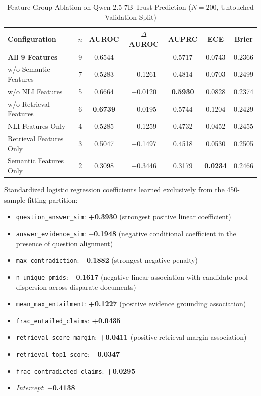 \documentclass[journal,10pt]{IEEEtran}
\begin{document}
\begin{table}[htbp]
\caption{Feature Group Ablation on Qwen 2.5 7B Trust Prediction ($N=200$, Untouched Validation Split)}
\label{tab:ablation}
\centering
\begin{tabular}{lcccccc}
\toprule
\textbf{Configuration} & \textbf{$n$} & \textbf{AUROC} & \textbf{$\Delta$ AUROC} & \textbf{AUPRC} & \textbf{ECE} & \textbf{Brier} \\
\midrule
\textbf{All 9 Features} & 9 & 0.6544 & --- & 0.5717 & 0.0743 & 0.2366 \\
w/o Semantic Features & 7 & 0.5283 & $-$0.1261 & 0.4814 & 0.0703 & 0.2499 \\
w/o NLI Features & 5 & 0.6664 & +0.0120 & \textbf{0.5930} & 0.0828 & 0.2374 \\
w/o Retrieval Features & 6 & \textbf{0.6739} & +0.0195 & 0.5744 & 0.1204 & 0.2429 \\
NLI Features Only & 4 & 0.5285 & $-$0.1259 & 0.4732 & 0.0452 & 0.2455 \\
Retrieval Features Only & 3 & 0.5047 & $-$0.1497 & 0.4518 & 0.0530 & 0.2505 \\
Semantic Features Only & 2 & 0.3098 & $-$0.3446 & 0.3179 & \textbf{0.0234} & 0.2466 \\
\bottomrule
\end{tabular}
\end{table}

Standardized logistic regression coefficients learned exclusively from the 450-sample fitting partition:
\begin{itemize}
    \item \texttt{question\_answer\_sim}: \textbf{+0.3930} (strongest positive linear coefficient)
    \item \texttt{answer\_evidence\_sim}: \textbf{$-$0.1948} (negative conditional coefficient in the presence of question alignment)
    \item \texttt{max\_contradiction}: \textbf{$-$0.1882} (strongest negative penalty)
    \item \texttt{n\_unique\_pmids}: \textbf{$-$0.1617} (negative linear association with candidate pool dispersion across disparate documents)
    \item \texttt{mean\_max\_entailment}: \textbf{+0.1227} (positive evidence grounding association)
    \item \texttt{frac\_entailed\_claims}: \textbf{+0.0435}
    \item \texttt{retrieval\_score\_margin}: \textbf{+0.0411} (positive retrieval margin association)
    \item \texttt{retrieval\_top1\_score}: \textbf{$-$0.0347}
    \item \texttt{frac\_contradicted\_claims}: \textbf{+0.0295}
    \item \textit{Intercept}: \textbf{$-$0.4138}
\end{itemize}
\end{document}
